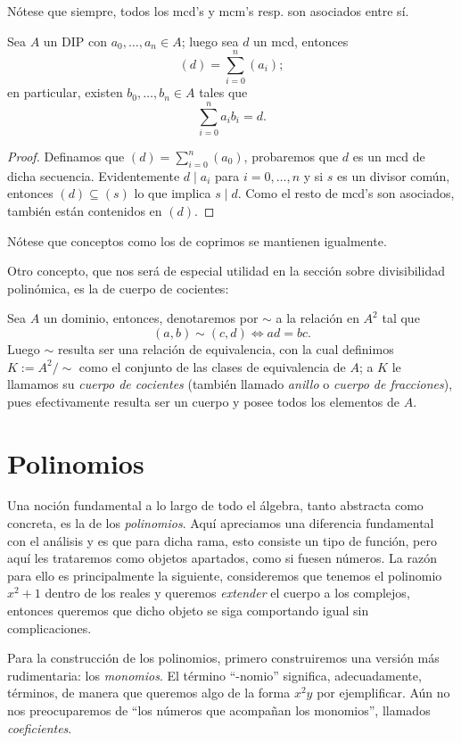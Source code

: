 \documentclass[11pt,oneside]{book}
\begin{document}
Nótese que siempre, todos los mcd's y mcm's resp. son asociados entre sí.
\begin{thm}
Sea $A$ un DIP con $a_0,\dots,a_n\in A$; luego sea $d$ un mcd, entonces
$$(d)=\sum_{i=0}^n(a_i);$$
en particular, existen $b_0,\dots,b_n\in A$ tales que
$$\sum_{i=0}^n a_ib_i=d.$$
\end{thm}
\begin{proof}
Definamos que $(d)=\sum_{i=0}^n(a_0)$, probaremos que $d$ es un mcd de dicha secuencia. Evidentemente $d\mid a_i$ para $i=0,\dots,n$ y si $s$ es un divisor común, entonces $(d)\subseteq(s)$ lo que implica $s\mid d$. Como el resto de mcd's son asociados, también están contenidos en $(d)$.
\end{proof}
Nótese que conceptos como los de coprimos se mantienen igualmente.

Otro concepto, que nos será de especial utilidad en la sección sobre divisibilidad polinómica, es la de cuerpo de cocientes:
\begin{thm}
Sea $A$ un dominio, entonces, denotaremos por $\sim$ a la relación en $A^2$ tal que
$$(a,b)\sim(c,d)\iff ad=bc.$$
Luego $\sim$ resulta ser una relación de equivalencia, con la cual definimos $K:=A^2/\sim$ como el conjunto de las clases de equivalencia de $A$; a $K$ le llamamos su \textit{cuerpo de cocientes} (también llamado \textit{anillo} o \textit{cuerpo de fracciones}), pues efectivamente resulta ser un cuerpo y posee todos los elementos de $A$.
\end{thm}

\section{Polinomios}
Una noción fundamental a lo largo de todo el álgebra, tanto abstracta como concreta, es la de los \textit{polinomios}. Aquí apreciamos una diferencia fundamental con el análisis y es que para dicha rama, esto consiste un tipo de función, pero aquí les trataremos como objetos apartados, como si fuesen números. La razón para ello es principalmente la siguiente, consideremos que tenemos el polinomio $x^2+1$ dentro de los reales y queremos \textit{extender} el cuerpo a los complejos, entonces queremos que dicho objeto se siga comportando igual sin complicaciones.

Para la construcción de los polinomios, primero construiremos una versión más rudimentaria: los \textit{monomios}. El término ``-nomio'' significa, adecuadamente, términos, de manera que queremos algo de la forma $x^2y$ por ejemplificar. Aún no nos preocuparemos de ``los números que acompañan los monomios'', llamados \textit{coeficientes}.
\end{document}
